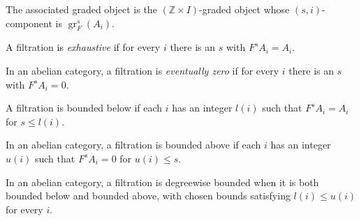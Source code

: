 \begin{definition}
  \leanok
  \label{def:core-associated-graded-object}
  The associated graded object is the $(\mathbb Z\times I)$-graded object
  whose $(s,i)$-component is $\operatorname{gr}^s_F(A_i)$.
\end{definition}

\begin{definition}
  \leanok
  \label{def:core-exhaustive-filtration}
  A filtration is \emph{exhaustive} if for every $i$ there is an $s$ with
  $F^sA_i=A_i$.
\end{definition}

\begin{definition}
  \leanok
  \label{def:core-eventually-zero-filtration}
  In an abelian category, a filtration is \emph{eventually zero} if for every
  $i$ there is an $s$
  with $F^sA_i=0$.
\end{definition}

\begin{definition}
  \leanok
  \label{def:core-bounded-below-filtration}
  A filtration is bounded below if each $i$ has an integer $l(i)$ such
  that $F^sA_i=A_i$ for $s\le l(i)$.
\end{definition}

\begin{definition}
  \leanok
  \label{def:core-bounded-above-filtration}
  In an abelian category, a filtration is bounded above if each $i$ has an
  integer $u(i)$ such that $F^sA_i=0$ for $u(i)\le s$.
\end{definition}

\begin{definition}
  \leanok
  \label{def:core-bounded-filtration}
  In an abelian category, a filtration is degreewise bounded when it is both
  bounded below and bounded above, with chosen bounds satisfying
  $l(i)\le u(i)$ for every $i$.
\end{definition}


